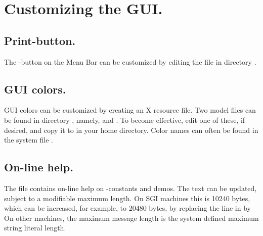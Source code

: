 \section{ Customizing the GUI.} \label{sec:Customizing_the_GUI}
\subsection{ Print-button.}
The -button on the Menu Bar can be customized 
by editing the file  in directory .

\subsection{ GUI colors.}
GUI colors can be customized by creating an X resource file.
Two model files can be found in directory , namely,
 and .
To become effective, edit one of these, if desired,
and copy it to  in your home directory.
Color names can often be found in the system file .

\subsection{ On-line help.}
The file 
contains on-line help on \AUTO-constants and demos.
The text can be updated, subject to a modifiable maximum length.
On SGI machines this is 10240 bytes,
which can be increased, for example, to 20480 bytes, 
by replacing the line
in  by
On other machines, the maximum message length is the system defined maximum
string literal length.

